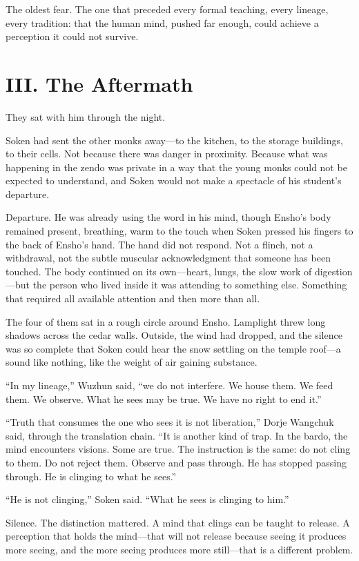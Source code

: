 The oldest fear. The one that preceded every formal teaching, every lineage, every tradition: that the human mind, pushed far enough, could achieve a perception it could not survive.


\section*{III. The Aftermath}

They sat with him through the night.

Soken had sent the other monks away---to the kitchen, to the storage buildings, to their cells. Not because there was danger in proximity. Because what was happening in the zendo was private in a way that the young monks could not be expected to understand, and Soken would not make a spectacle of his student's departure.

Departure. He was already using the word in his mind, though Ensho's body remained present, breathing, warm to the touch when Soken pressed his fingers to the back of Ensho's hand. The hand did not respond. Not a flinch, not a withdrawal, not the subtle muscular acknowledgment that someone has been touched. The body continued on its own---heart, lungs, the slow work of digestion---but the person who lived inside it was attending to something else. Something that required all available attention and then more than all.

The four of them sat in a rough circle around Ensho. Lamplight threw long shadows across the cedar walls. Outside, the wind had dropped, and the silence was so complete that Soken could hear the snow settling on the temple roof---a sound like nothing, like the weight of air gaining substance.

``In my lineage,'' Wuzhun said, ``we do not interfere. We house them. We feed them. We observe. What he sees may be true. We have no right to end it.''

``Truth that consumes the one who sees it is not liberation,'' Dorje Wangchuk said, through the translation chain. ``It is another kind of trap. In the bardo, the mind encounters visions. Some are true. The instruction is the same: do not cling to them. Do not reject them. Observe and pass through. He has stopped passing through. He is clinging to what he sees.''

``He is not clinging,'' Soken said. ``What he sees is clinging to him.''

Silence. The distinction mattered. A mind that clings can be taught to release. A perception that holds the mind---that will not release because seeing it produces more seeing, and the more seeing produces more still---that is a different problem.

